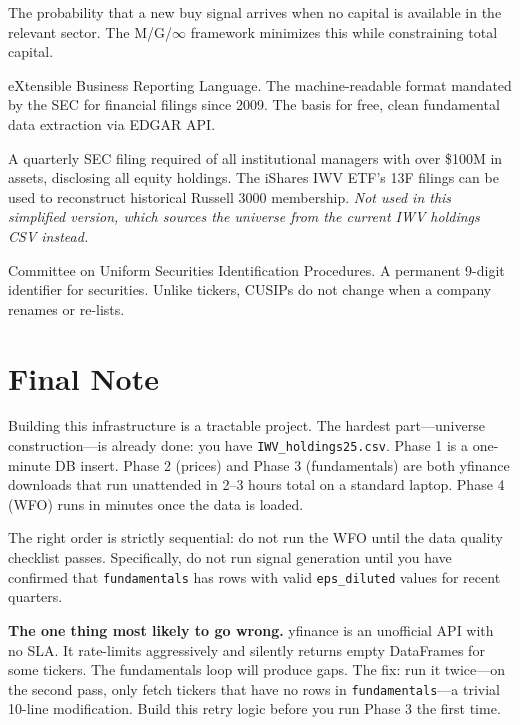 \documentclass[11pt, oneside]{book}
\begin{document}
\begin{description}[leftmargin=3cm, style=nextline]
    \item[\textbf{Stockout Risk}] The probability that a new buy signal arrives when no capital is available in the relevant sector. The M/G/$\infty$ framework minimizes this while constraining total capital.

    \item[\textbf{XBRL}] eXtensible Business Reporting Language. The machine-readable format mandated by the SEC for financial filings since 2009. The basis for free, clean fundamental data extraction via EDGAR API.

    \item[\textbf{13F Filing}] A quarterly SEC filing required of all institutional managers with over \$100M in assets, disclosing all equity holdings. The iShares IWV ETF's 13F filings can be used to reconstruct historical Russell 3000 membership. \textit{Not used in this simplified version, which sources the universe from the current IWV holdings CSV instead.}

    \item[\textbf{CUSIP}] Committee on Uniform Securities Identification Procedures. A permanent 9-digit identifier for securities. Unlike tickers, CUSIPs do not change when a company renames or re-lists.
\end{description}

\backmatter

\chapter*{Final Note}

Building this infrastructure is a tractable project. The hardest part---universe construction---is already done: you have \texttt{IWV\_holdings25.csv}. Phase 1 is a one-minute DB insert. Phase 2 (prices) and Phase 3 (fundamentals) are both yfinance downloads that run unattended in 2--3 hours total on a standard laptop. Phase 4 (WFO) runs in minutes once the data is loaded.

The right order is strictly sequential: do not run the WFO until the data quality checklist passes. Specifically, do not run signal generation until you have confirmed that \texttt{fundamentals} has rows with valid \texttt{eps\_diluted} values for recent quarters.

\begin{warningbox}
\textbf{The one thing most likely to go wrong.} yfinance is an unofficial API with no SLA. It rate-limits aggressively and silently returns empty DataFrames for some tickers. The fundamentals loop will produce gaps. The fix: run it twice---on the second pass, only fetch tickers that have no rows in \texttt{fundamentals}---a trivial 10-line modification. Build this retry logic before you run Phase 3 the first time.
\end{warningbox}
\end{document}
